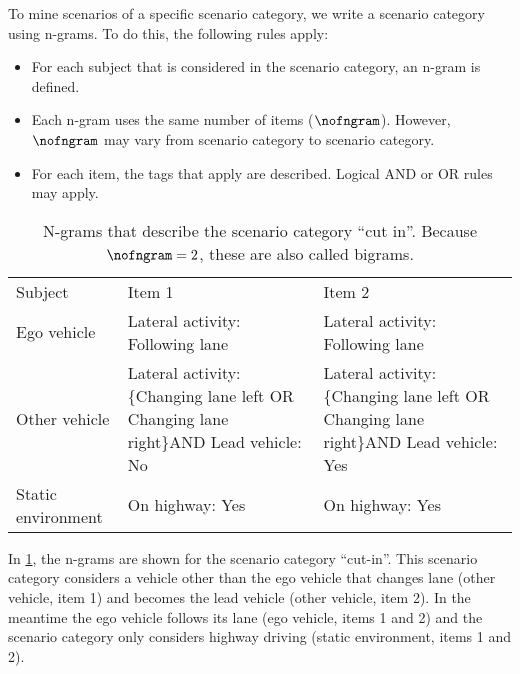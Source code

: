 To mine scenarios of a specific scenario category, we write a scenario category using n-grams. 
To do this, the following rules apply:
\begin{itemize}
	\item For each subject that is considered in the scenario category, an n-gram is defined.
	\item Each n-gram uses the same number of items ($\nofngram$). However, $\nofngram$ may vary from scenario category to scenario category.
	\item For each item, the tags that apply are described. Logical AND or OR rules may apply.
\end{itemize}

\begin{table}
	\centering
	\caption{\cstartb N-grams that describe the scenario category ``cut in''. Because $\nofngram=2$, these are also called bigrams.\cendb}
	\label{tab:ngrams cutin}
	\cstartb
	\begin{tabularx}{\linewidth}{p{5.5em}XX}
		\toprule
		Subject & Item 1 & Item 2 \\ \otoprule
		Ego vehicle & Lateral activity: \newline Following lane & Lateral activity: \newline Following lane \\
		Other vehicle & Lateral activity: \newline \{Changing lane left OR \newline \phantom{\{}Changing lane right\}\newline AND Lead vehicle: No & Lateral activity: \newline \{Changing lane left OR \newline \phantom{\{}Changing lane right\}\newline AND Lead vehicle: Yes \\
		Static environment & On highway: Yes & On highway: Yes \\
		\bottomrule
	\end{tabularx}
	\cendb
\end{table}

In \cref{tab:ngrams cutin}, the n-grams are shown for the scenario category ``cut-in''. 
This scenario category considers a vehicle other than the ego vehicle that changes lane (other vehicle, item 1) and becomes the lead vehicle (other vehicle, item 2). 
In the meantime the ego vehicle follows its lane (ego vehicle, items 1 and 2) and the scenario category only considers highway driving (static environment, items 1 and 2).

